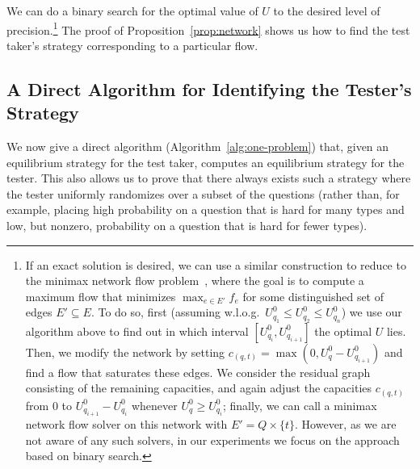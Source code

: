 \documentclass{article}
\begin{document}

We can do a binary search for the optimal value of $U$ to the desired level of
precision.\footnote{If an exact solution is desired, we can use a similar construction to
  reduce to the minimax network flow problem~\cite{Han199711}, where the goal is
  to compute a maximum flow that minimizes $\max_{e \in
    E'} f_e$ for some distinguished set of edges $E' \subseteq E$.  To do
  so, first (assuming w.l.o.g.~$U_{q_1}^0 \leq U_{q_2}^0 \leq U_{q_n}^0$)
  we use our algorithm above to find out in which interval $[U_{q_i}^0,
  U_{q_{i+1}}^0]$ the optimal $U$ lies.  Then, we modify the network by
  setting $c_{(q, t)} = \max(0, U_q^0-U_{q_{i+1}}^0)$ and find a flow that
  saturates these edges.  We consider the residual graph consisting of the
  remaining capacities, and again adjust the capacities $c_{(q, t)}$ from
  $0$ to $U_{q_{i+1}}^0-U_{q_i}^0$ whenever $U_q^0 \geq U_{q_i}^0$;
  finally, we can call a minimax network flow solver on this network with
  $E' = Q \times \{t\}$.  However, as we are not aware of any such
  solvers, in our experiments we focus on the approach based on binary search.}
The proof of Proposition~\ref{prop:network} shows us how to find the 
 test taker's strategy corresponding to a particular flow.


\subsection{A Direct Algorithm for Identifying the Tester's Strategy}

We now give a direct algorithm (Algorithm~\ref{alg:one-problem}) that, given an equilibrium strategy for the
test taker, computes an equilibrium strategy for the tester.
This also allows us to prove that there always exists such a strategy where
the tester uniformly randomizes over a subset of the questions (rather
than, for example, placing high probability on a question that is hard for
many types and low, but nonzero, probability on a question that is hard for
fewer types).
\end{document}
